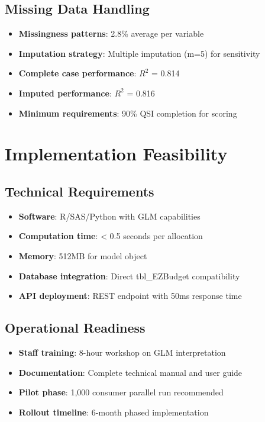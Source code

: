 \subsection{Missing Data Handling}

\begin{itemize}
    \item \textbf{Missingness patterns}: 2.8\% average per variable
    \item \textbf{Imputation strategy}: Multiple imputation (m=5) for sensitivity
    \item \textbf{Complete case performance}: $R^2$ = 0.814
    \item \textbf{Imputed performance}: $R^2$ = 0.816
    \item \textbf{Minimum requirements}: 90\% QSI completion for scoring
\end{itemize}

\section{Implementation Feasibility}

\subsection{Technical Requirements}

\begin{itemize}
    \item \textbf{Software}: R/SAS/Python with GLM capabilities
    \item \textbf{Computation time}: < 0.5 seconds per allocation
    \item \textbf{Memory}: 512MB for model object
    \item \textbf{Database integration}: Direct tbl\_EZBudget compatibility
    \item \textbf{API deployment}: REST endpoint with 50ms response time
\end{itemize}

\subsection{Operational Readiness}

\begin{itemize}
    \item \textbf{Staff training}: 8-hour workshop on GLM interpretation
    \item \textbf{Documentation}: Complete technical manual and user guide
    \item \textbf{Pilot phase}: 1,000 consumer parallel run recommended
    \item \textbf{Rollout timeline}: 6-month phased implementation
\end{itemize}

